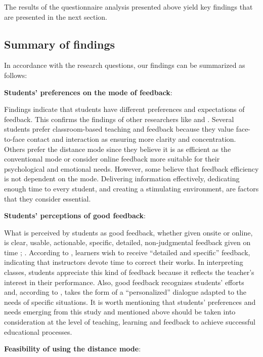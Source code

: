 \documentclass[english]{textolivre}
\begin{document}
The results of the questionnaire analysis presented above yield key findings that are presented in the next section.

\subsection{Summary of findings}

In accordance with the research questions, our findings can be summarized as follows:

\textbf{Students’ preferences on the mode of feedback}:

Findings indicate that students have different preferences and expectations of feedback. This confirms the findings of other researchers like \cite[p. 156]{lee_feedback_2018} and \cite[p. 325]{odonovan_what_2021}. Several students prefer classroom-based teaching and feedback because they value face-to-face contact and interaction as ensuring more clarity and concentration. Others prefer the distance mode since they believe it is as efficient as the conventional mode or consider online feedback more suitable for their psychological and emotional needs.  However, some believe that feedback efficiency is not dependent on the mode. Delivering information effectively, dedicating enough time to every student, and creating a stimulating environment, are factors that they consider essential.

\textbf{Students’ perceptions of good feedback}:

What is perceived by students as good feedback, whether given onsite or online, is clear, usable, actionable, specific, detailed, non-judgmental feedback given on time \cite[p. 45]{omer_criteria_2017}; \cite[p. 1408]{henderson_conditions_2019}. According to \textcite[p. 322]{odonovan_what_2021}, learners wish to receive “detailed and specific” feedback, indicating that instructors devote time to correct their works. In interpreting classes, students appreciate this kind of feedback because it reflects the teacher’s interest in their performance. Also, good feedback recognizes students’ efforts and, according to \textcite[p. 10]{torres_interpreting_2016}, takes the form of a “personalized” dialogue adapted to the needs of specific situations. It is worth mentioning that students’ preferences and needs emerging from this study and mentioned above should be taken into consideration at the level of teaching, learning and feedback to achieve successful educational processes.

\textbf{Feasibility of using the distance mode}:
\end{document}
